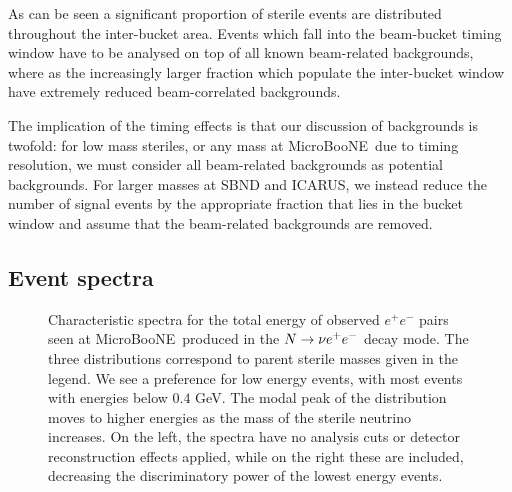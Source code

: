 \documentclass[11pt, a4paper]{article}
\def\muboone{MicroBooNE}
\def\ster{\ensuremath N}
\begin{document}
As can be seen a significant proportion of sterile events are distributed throughout the inter-bucket area. Events which fall into the beam-bucket timing window have to be analysed on top of all known beam-related backgrounds, where as the increasingly larger fraction which populate the inter-bucket window have extremely reduced beam-correlated backgrounds.  

The implication of the timing effects is that our discussion of backgrounds is
twofold: for low mass steriles, or any mass at \muboone\ due to timing
resolution, we must consider all beam-related backgrounds as potential
backgrounds. For larger masses at SBND and ICARUS, we instead reduce the number of signal events by the appropriate fraction that lies in the bucket window and assume that the beam-related backgrounds are removed. 


\subsection{\label{sec:eventspectra}Event spectra}

%
\begin{figure}[t]
%
\center
%
\large

\resizebox{\columnwidth}{!}{}
%
\caption{\label{fig:spectrum_ee} Characteristic spectra for the total energy of observed  $e^+e^-$ pairs seen at \muboone\ produced in the $\ster \to \nu e^+e^-$ decay mode. The three distributions correspond to parent sterile masses given in the legend. We see a preference for low energy events, with most events with energies below $0.4$ GeV. The modal peak of the distribution moves to higher energies as the mass of the sterile neutrino increases. On the left, the spectra have no analysis cuts or detector reconstruction effects applied, while on the right these are included, decreasing the discriminatory power of the lowest energy events.}
%
\end{figure}
\end{document}
